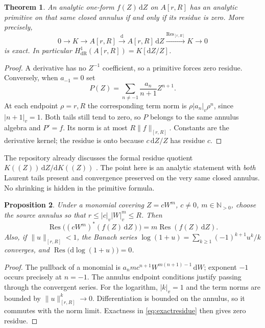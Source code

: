 \documentclass[11pt,a4paper]{article}
\numberwithin{equation}{section}
\newtheorem{theorem}{Theorem}[section]
\newtheorem{proposition}[theorem]{Proposition}
\theoremstyle{definition}
\theoremstyle{remark}
\newcommand{\N}{\mathbb N}
\newcommand{\vabs}[1]{\lvert#1\rvert_v}
\newcommand{\Gauss}[2]{\lVert#1\rVert_{#2}}
\newcommand{\Res}{\operatorname{Res}}
\newcommand{\dR}{\mathrm{dR}}
\newcommand{\dd}{\,\mathrm d}
\begin{document}
\begin{theorem}\label{thm:annulusderham}
An analytic one-form $f(Z)\dd Z$ on $A[r,R]$ has an analytic primitive on that
same closed annulus if and only if its residue is zero. More precisely,
\begin{equation}\label{eq:exactresidue}
 0\longrightarrow K\longrightarrow A[r,R]
 \xrightarrow{\mathrm d} A[r,R]\dd Z
 \xrightarrow{\Res_{[r,R]}}K\longrightarrow0
\end{equation}
is exact. In particular
$H^1_{\dR}(A[r,R])=K[\mathrm dZ/Z]$.
\end{theorem}
\begin{proof}
A derivative has no $Z^{-1}$ coefficient, so a primitive forces zero residue.
Conversely, when $a_{-1}=0$ set
\[
 P(Z)=\sum_{n\ne-1}\frac{a_n}{n+1}Z^{n+1}.
\]
At each endpoint $\rho=r,R$ the corresponding term norm is
$\rho\vabs{a_n}\rho^n$, since $\vabs{n+1}=1$. Both tails still tend to zero,
so $P$ belongs to the same annulus algebra and $P'=f$.
Its norm is at most $R\Gauss f{[r,R]}$. Constants are the derivative kernel;
the residue is onto because $c\,\mathrm dZ/Z$ has residue $c$.
\end{proof}

The repository already discusses the formal residue quotient
$K((Z))\dd Z/\mathrm dK((Z))$ \cite{RepoContours}. The point here is an analytic
statement with \emph{both} Laurent tails present and convergence preserved on
the very same closed annulus. No shrinking is hidden in the primitive formula.

\begin{proposition}\label{prop:residuepullback}
Under a monomial covering $Z=cW^m$, $c\ne0$, $m\in\N_{>0}$, choose the source
annulus so that $r\le\vabs c\vabs W^m\le R$. Then
\[
 \Res\bigl((cW^m)^*(f(Z)\dd Z)\bigr)=m\Res(f(Z)\dd Z).
\]
Also, if $\Gauss u{[r,R]}<1$, the Banach series
$\log(1+u)=\sum_{k\ge1}(-1)^{k+1}u^k/k$ converges, and
$\Res\bigl(\mathrm d\log(1+u)\bigr)=0$.
\end{proposition}
\begin{proof}
The pullback of a monomial is
$a_n m c^{n+1}W^{m(n+1)-1}\dd W$; exponent $-1$ occurs precisely at $n=-1$.
The annulus endpoint conditions justify passing through the convergent series.
For the logarithm, $\vabs k=1$ and the term norms are bounded by
$\Gauss u{[r,R]}^k\to0$. Differentiation is bounded on the annulus, so it
commutes with the norm limit. Exactness in \eqref{eq:exactresidue} then gives
zero residue.
\end{proof}
\end{document}

